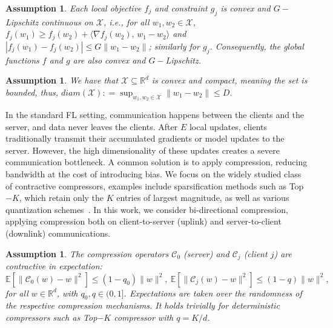 \documentclass{article} %
\newtheorem{assumption}[]{Assumption}
\def\R{{\mathbb{R}}}
\begin{document}
\begin{assumption}
\label{as:cvx_lip}
Each local objective $f_j$ and constraint $g_j$ is convex and $G-$Lipschitz continuous on $\mathcal{X}$, i.e., for all $w_1,w_2\in\mathcal{X}$, $f_j(w_1) \ge f_j(w_2) + \langle \nabla f_j(w_2),\, w_1 - w_2 \rangle$ and $|f_j(w_1)-f_j(w_2)|\le G\|w_1-w_2\|$; similarly for $g_j$. Consequently, the global functions $f$ and $g$ are also convex and $G-$Lipschitz.
\end{assumption}
\begin{assumption}
    \label{as:bdd_domain}
    We have that $\mathcal{X}\subseteq\R^d$ is convex and compact, meaning the set is bounded, thus,
    $diam(\mathcal{X}): = \sup_{w_1,w_2\in \mathcal{X}}\|w_1 - w_2\| \leq D.$
\end{assumption}
\vspace{-0.43em}
In the standard FL setting, communication happens between the clients and the server, and data never leaves the clients. After $E$ local updates, clients traditionally transmit their accumulated gradients or model updates to the server. However, the high dimensionality of these updates creates a severe communication bottleneck. A common solution is to apply compression, reducing bandwidth at the cost of introducing bias. We focus on the widely studied class of {contractive compressors}, examples include sparsification methods such as Top$-K$, which retain only the $K$ entries of largest magnitude, as well as various quantization schemes~\citep{stich2018sparsified, alistarh2018convergence, wen2017terngrad, horvoth2022natural, islamov2024towards, beznosikov2023biased}. In this work, we consider {bi-directional compression}, applying compression both on client-to-server (uplink) and server-to-client (downlink) communications.

\begin{assumption}
\label{as:compression_biased}
The compression operators $\mathcal{C}_0$ (server) and $\mathcal{C}_j$ (client $j$) are contractive in expectation:
$
\mathbb{E}[\| \mathcal{C}_0(w) - w \|^2] \leq (1 - q_0)\|w\|^2,\ 
\mathbb{E}[\| \mathcal{C}_j(w) - w \|^2] \leq (1 - q)\|w\|^2,
$
for all $w \in \mathbb{R}^d$, with $q_0, q \in (0,1]$. Expectations are taken over the randomness of the respective compression mechanisms. It holds trivially for deterministic compressors such as Top$-K$ compressor with $q = K/d$.
\end{assumption}
\end{document}
